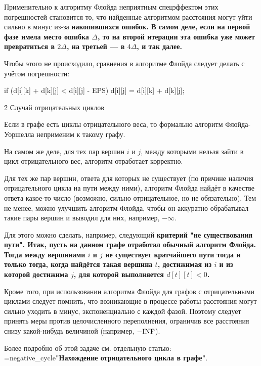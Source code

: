 Применительно к алгоритму Флойда неприятным спецэффектом этих погрешностей становится то, что найденные алгоритмом расстояния могут уйти сильно в минус из-за \bf{накопившихся ошибок}. В самом деле, если на первой фазе имела место ошибка $\Delta$, то на второй итерации эта ошибка уже может превратиться в $2 \Delta$, на третьей --- в $4 \Delta$, и так далее.

Чтобы этого не происходило, сравнения в алгоритме Флойда следует делать с учётом погрешности:

\code
if (d[i][k] + d[k][j] < d[i][j] - EPS)
	d[i][j] = d[i][k] + d[k][j];
\endcode


\h2{ Случай отрицательных циклов }

Если в графе есть циклы отрицательного веса, то формально алгоритм Флойда-Уоршелла неприменим к такому графу.

На самом же деле, для тех пар вершин $i$ и $j$, между которыми нельзя зайти в цикл отрицательного вес, алгоритм отработает корректно.

Для тех же пар вершин, ответа для которых не существует (по причине наличия отрицательного цикла на пути между ними), алгоритм Флойда найдёт в качестве ответа какое-то число (возможно, сильно отрицательное, но не обязательно). Тем не менее, можно улучшить алгоритм Флойда, чтобы он аккуратно обрабатывал такие пары вершин и выводил для них, например, $- \infty$.

Для этого можно сделать, например, следующий \bf{критерий} "не существования пути". Итак, пусть на данном графе отработал обычный алгоритм Флойда. Тогда между вершинами $i$ и $j$ не существует кратчайшего пути тогда и только тогда, когда найдётся такая вершина $t$, достижимая из $i$ и из которой достижима $j$, для которой выполняется $d[t][t] < 0$.

Кроме того, при использовании алгоритма Флойда для графов с отрицательными циклами следует помнить, что возникающие в процессе работы расстояния могут сильно уходить в минус, экспоненциально с каждой фазой. Поэтому следует принять меры против целочисленного переполнения, ограничив все расстояния снизу какой-нибудь величиной (например, $- {\rm INF}$).

Более подробно об этой задаче см. отдельную статью: \algohref=negative_cycle{\bf{"Нахождение отрицательного цикла в графе"}}.
